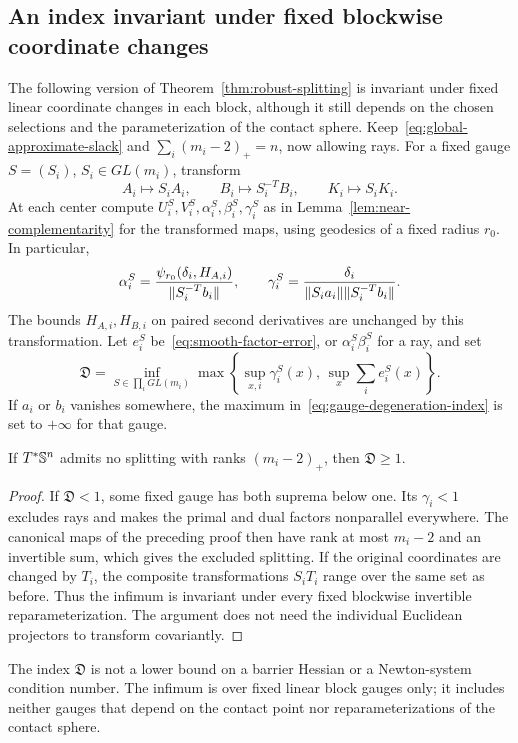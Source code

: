 \subsection{An index invariant under fixed blockwise coordinate changes}
The following version of Theorem~\ref{thm:robust-splitting} is invariant
under fixed linear coordinate changes in each block, although it still
depends on the chosen selections and the parameterization of the contact
sphere. Keep~\eqref{eq:global-approximate-slack} and
$\sum_i(m_i-2)_+=n$, now allowing rays. For a fixed gauge $S=(S_i)$,
$S_i\in GL(m_i)$, transform
\[
 A_i\mapsto S_iA_i,\qquad B_i\mapsto S_i^{-T}B_i,
 \qquad K_i\mapsto S_iK_i.
\]
At each center compute $U_i^S,V_i^S,\alpha_i^S,\beta_i^S,\gamma_i^S$
as in Lemma~\ref{lem:near-complementarity} for the transformed maps,
using geodesics of a fixed radius $r_0$. In particular,
\[
 \alpha_i^S=\frac{\psi_{r_0}(\delta_i,H_{A,i})}{\lVert S_i^{-T}b_i\rVert},
 \qquad
 \gamma_i^S=\frac{\delta_i}{\lVert S_i a_i\rVert\lVert S_i^{-T}b_i\rVert}.
\]
The bounds $H_{A,i},H_{B,i}$ on paired second derivatives are
unchanged by this transformation. Let $e_i^S$ be~\eqref{eq:smooth-factor-error},
or $\alpha_i^S\beta_i^S$ for a ray, and set
\begin{equation}\label{eq:gauge-degeneration-index}
 \mathfrak D=\inf_{S\in\prod_i GL(m_i)}
 \max\left\{\sup_{x,i}\gamma_i^S(x),\,
                 \sup_x\sum_i e_i^S(x)\right\}.
\end{equation}
If $a_i$ or $b_i$ vanishes somewhere, the maximum
in~\eqref{eq:gauge-degeneration-index} is set to $+\infty$ for that
gauge.

\begin{corollary}
\label{cor:gauge-degeneration}
If $T^*\mathbb S^n$ admits no splitting with ranks $(m_i-2)_+$, then
$\mathfrak D\geq1$.
\end{corollary}
\begin{proof}
If $\mathfrak D<1$, some fixed gauge has both suprema below one.
Its $\gamma_i<1$ excludes rays and makes the primal and dual factors
nonparallel everywhere. The canonical maps of the preceding proof
then have rank at most $m_i-2$ and an invertible sum, which gives the
excluded splitting. If the original coordinates are changed by $T_i$,
the composite transformations $S_iT_i$ range over the same set as
before. Thus the infimum is invariant under every fixed blockwise
invertible reparameterization. The argument does not need the individual
Euclidean projectors to transform covariantly.
\end{proof}
The index $\mathfrak D$ is not a lower bound on a barrier Hessian or a
Newton-system condition number. The infimum is over fixed linear block
gauges only; it includes neither gauges that depend on the contact point
nor reparameterizations of the contact sphere.

